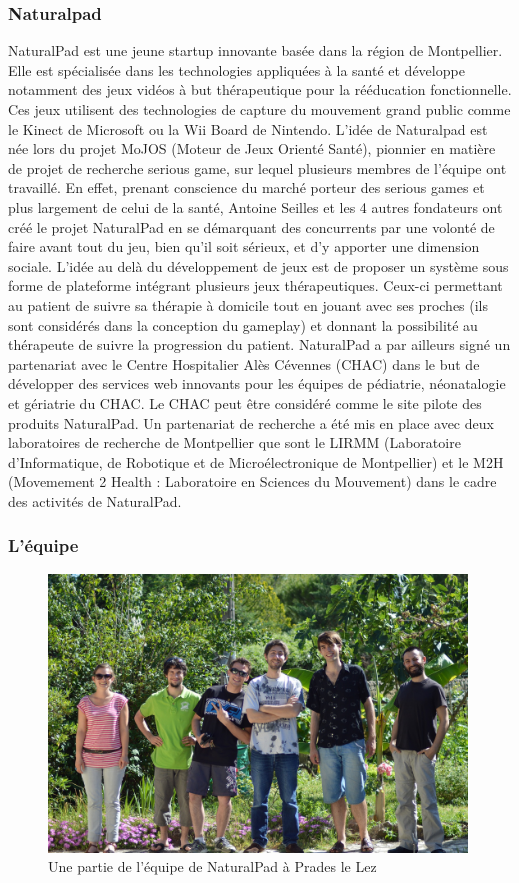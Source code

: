 	\subsubsection{Naturalpad}
NaturalPad est une jeune startup innovante basée dans la région de Montpellier. Elle est spécialisée dans les technologies appliquées à la santé et développe notamment des jeux vidéos à but thérapeutique pour la rééducation fonctionnelle. Ces jeux utilisent des technologies de capture du mouvement grand public comme le Kinect de Microsoft ou la Wii Board de Nintendo. L’idée de Naturalpad est née lors du projet MoJOS (Moteur de Jeux Orienté Santé), pionnier en matière de projet de recherche serious game, sur lequel plusieurs membres de l’équipe ont travaillé. En effet, prenant conscience du marché porteur des serious games et plus largement de celui de la santé, Antoine Seilles et les 4 autres fondateurs ont créé le projet NaturalPad en se démarquant des concurrents par une volonté de faire avant tout du jeu, bien qu’il soit sérieux, et d’y apporter une dimension sociale. L’idée au delà du développement de jeux est de proposer un système sous forme de plateforme intégrant plusieurs jeux thérapeutiques. Ceux-ci permettant au patient de suivre sa thérapie à domicile tout en jouant avec ses proches (ils sont considérés dans la conception du gameplay) et donnant la possibilité au thérapeute de suivre la progression du patient. NaturalPad a par ailleurs signé un partenariat avec le Centre Hospitalier Alès Cévennes (CHAC) dans le but de développer des services web innovants pour les équipes de pédiatrie, néonatalogie et gériatrie du CHAC. Le CHAC peut être considéré comme le site pilote des produits NaturalPad. Un partenariat de recherche a été mis en place avec deux laboratoires de recherche de Montpellier que sont le LIRMM (Laboratoire d’Informatique, de Robotique et de Microélectronique de Montpellier) et le M2H (Movemement 2 Health : Laboratoire en Sciences du Mouvement) dans le cadre des activités de NaturalPad.

	\subsubsection{L'équipe}
	\begin{figure}[!h]
		\centering
		\includegraphics[width=420px]{images/naturalpad_groupe.jpg}
		\caption{Une partie de l'équipe de NaturalPad à Prades le Lez}
		\label{naturalpad_groupe}
	\end{figure}
	
